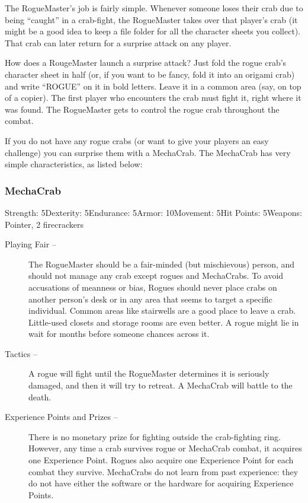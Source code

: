 \documentclass[a4paper,10pt]{article}
\begin{document}
The RogueMaster's job is fairly simple. Whenever someone loses their crab due to being ``caught'' in a crab-fight, the RogueMaster takes over that player's crab (it might be a good idea to keep a file folder for all the character sheets you collect). That crab can later return for a surprise attack on any player.

How does a RougeMaster launch a surprise attack? Just fold the rogue crab's character sheet in half (or, if you want to be fancy, fold it into an origami crab) and write ``ROGUE'' on it in bold letters. Leave it in a common area (say, on top of a copier). The first player who encounters the crab must fight it, right where it was found. The RogueMaster gets to control the rogue crab throughout the combat.

If you do not have any rogue crabs (or want to give your players an easy challenge) you can surprise them with a MechaCrab. The MechaCrab has very simple characteristics, as listed below:

\subsubsection*{MechaCrab}
\label{sec:MechaCrab}

Strength: 5\newline{}Dexterity: 5\newline\bigskip{}Endurance: 5\newline{}Armor: 10\newline{}Movement: 5\newline\bigskip{}Hit Points: 5\newline{}Weapons: Pointer, 2 firecrackers

\begin{description}
 \item[Playing Fair --] The RogueMaster should be a fair-minded (but mischievous) person, and should not manage any crab except rogues and MechaCrabs. To avoid accusations of meanness or bias, Rogues should never place crabs on another person's desk or in any area that seems to target a specific individual. Common areas like stairwells are a good place to leave a crab. Little-used closets and storage rooms are even better. A rogue might lie in wait for months before someone chances across it.
 \item[Tactics --] A rogue will fight until the RogueMaster determines it is seriously damaged, and then it will try to retreat. A MechaCrab will battle to the death.
 \item[Experience Points and Prizes --] There is no monetary prize for fighting outside the crab-fighting ring. However, any time a crab survives rogue or MechaCrab combat, it acquires one Experience Point. Rogues also acquire one Experience Point for each combat they survive. MechaCrabs do not learn from past experience: they do not have either the software or the hardware for acquiring Experience Points.
 \end{description}
\end{document}
